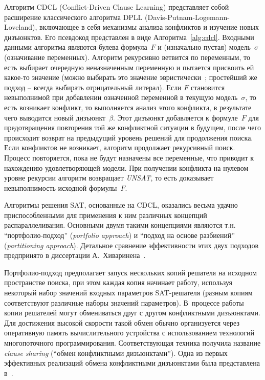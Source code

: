 Алгоритм CDCL (Conflict-Driven Clause Learning) представляет собой расширение классического алгоритма DPLL (Davis-Putnam-Logemann-Loveland), включающее в себя механизмы анализа конфликтов и изучение новых дизъюнктов.
Его псевдокод представлен в виде Алгоритма~\ref{alg:cdcl}.
Входными данными алгоритма являются булева формула~$F$ и (изначально пустая) модель~$\sigma$ (означивание переменных).
Алгоритм рекурсивно ветвится по переменным, то есть выбирает очередную неназначенным переменную и пытается присвоить ей какое-то значение (можно выбирать это значение эвристически~\cite{moskewicz2001}; простейший же подход \--- всегда выбирать отрицательный литерал).
Если $F$ становится невыполнимой при добавлении означенной переменной в текущую модель~$\sigma$, то есть возникает конфликт, то выполняется анализ этого конфликта, в результате чего выводится новый дизъюнкт~$\beta$.
Этот дизъюнкт добавляется к формуле~$F$ для предотвращения повторения той же конфликтной ситуации в будущем, после чего происходит возврат на предыдущий уровень решений для продолжения поиска.
Если конфликтов не возникает, алгоритм продолжает рекурсивный поиск.
Процесс повторяется, пока не будут назначены все переменные, что приводит к нахождению удовлетворяющей модели.
При получении конфликта на нулевом уровне рекурсии алгоритм возвращает \textit{UNSAT}, то есть доказывает невыполнимость исходной формулы~$F$.

Алгоритмы решения SAT, основанные на CDCL, оказались весьма удачно приспособленными для применения к ним различных концепций распараллеливания.
Основными двумя такими концепциями являются т.н. \enquote{портфолио-подход} (\textit{portfolio approach}) и \enquote{подход на основе разбиений} (\textit{partitioning approach}).
Детальное сравнение эффективности этих двух подходов предпринято в диссертации А.~Хиваринена~\cite{hyvarinen2011}.

Портфолио-подход предполагает запуск нескольких копий решателя на исходном пространстве поиска, при этом каждая копия начинает работу, используя некоторый набор значений входных параметров SAT-решателя (разным копиям соответствуют различные наборы значений параметров).
В~процессе работы копии решателей могут обмениваться друг с другом конфликтными дизъюнктами.
Для достижения высокой скорости такой обмен обычно организуется через оперативную память вычислительного устройства с использованием технологий многопоточного программирования.
Соответствующая техника получила название \textit{clause sharing} (\enquote{обмен конфликтными дизъюнктами}).
Одна из первых эффективных реализаций обмена конфликтными дизъюнктами была представлена в~\cite{hamadi2011}.

